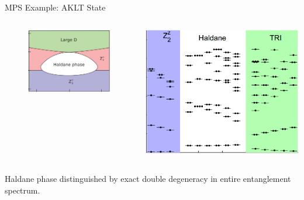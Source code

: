 \begin{frame}{MPS Example: AKLT State}
\vskip-1.5cm
\begin{figure}
\scalebox{2}{
            
            }
\end{figure}
\begin{columns}[T]
\begin{column}[T]{.5\textwidth}
\vskip-1.5cm
\begin{figure}
\includegraphics[width=\columnwidth]{diagrams/aklt2.png}
\end{figure}
\end{column}
   \begin{column}[T]{.5\textwidth}
   \vskip-1cm
    \includegraphics[width=\columnwidth]{diagrams/akltEE.png}
    \end{column}
\end{columns}

Haldane phase distinguished by exact double degeneracy in entire  entanglement spectrum.
\end{frame}